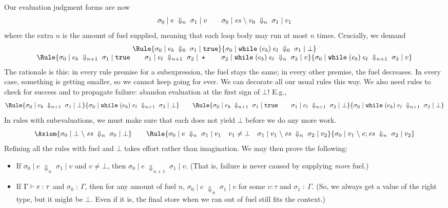 \documentclass{article}
\begin{document}
\newcommand{\JfEv}[5]{#1 \;|\; #2 \;\Downarrow_{#5}\; #3 \;|\; #4} 
\newcommand{\JfEvs}[6]{#1 \;|\; #2 \;\backslash\; #3 \;\Downarrow_{#6}\; #4 \;|\; #5}
Our evaluation judgment forms are now
\[\JfEv{\sigma_0}{e}{\sigma_1}{v}{n} \qquad
  \JfEvs{\sigma_0}{\es}{v_0}{\sigma_1}{v_1}{n}
\]
where the extra $n$ is the amount of fuel supplied, meaning that each
loop body may run at most $n$ times. Crucially, we demand
\[\begin{array}{c}
    \Rule{\JfEv{\sigma_0}{e_b}{\sigma_1}\true{0}}
    {\JfEv{\sigma_0}{\whi{e_b}{e_l}}{\sigma_1}{\bot}{0}}
    \\
    \Rule{\JfEv{\sigma_0}{e_b}{\sigma_1}\true{n+1} \qquad \JfEv{\sigma_1}{e_l}{\sigma_2}{\star}{n+1} \qquad
      \JfEv{\sigma_2}{\whi{e_b}{e_l}}{\sigma_3}{v}{n}  }
    {\JfEv{\sigma_0}{\whi{e_b}{e_l}}{\sigma_3}{v}{n+1}}
\end{array}\]
The rationale is this: in every rule premise for a subexpression,
the fuel stays the same; in every other premise, the fuel decreases.
In every case, something is getting smaller, so we cannot keep going
for ever. We can decorate all our usual rules this way.
We also need rules to check for success and to propagate failure:
abandon evaluation at the first sign of
$\bot$! E.g.,
\[
  \Rule{\JfEv{\sigma_0}{e_b}{\sigma_1}\bot{n+1} }
  {\JfEv{\sigma_0}{\whi{e_b}{e_l}}{\sigma_3}{\bot}{n+1}}
  \qquad
  \Rule{\JfEv{\sigma_0}{e_b}{\sigma_1}\true{n+1} \qquad \JfEv{\sigma_1}{e_l}{\sigma_2}{\bot}{n+1} }
    {\JfEv{\sigma_0}{\whi{e_b}{e_l}}{\sigma_3}{\bot}{n+1}}
  \]
In rules with subevaluations, we must make sure that each does not
  yield $\bot$ before we do any more work.
\[
  \Axiom{\JfEvs{\sigma_0}{\bot}{\es}{\sigma_0}{\bot}{n}} \qquad
 \Rule{\JfEv{\sigma_0}e{\sigma_1}{v_1}n \quad v_1\neq\bot\quad
    \JfEvs{\sigma_1}{v_1}{\es}{\sigma_2}{v_2}n}
   {\JfEvs{\sigma_0}{v_1}{e;\es}{\sigma_2}{v_2}n}
\]
Refining all the rules with fuel and $\bot$ takes effort rather than
imagination. We may then prove the following:
\begin{itemize}
\item If $\JfEv{\sigma_0}{e}{\sigma_1}{v}{n}$ and $v\neq \bot$, then
  $\JfEv{\sigma_0}{e}{\sigma_1}{v}{n+1}$. (That is, failure is never
  caused by supplying \emph{more} fuel.)
\item If $\Gamma \vdash e : \tau$ and $\sigma_0\;:\:\Gamma$, then for
  any amount of fuel $n$, $\JfEv{\sigma_0}{e}{\sigma_1}{v}{n}$ for
  some $v:\tau$ and $\sigma_1\;:\:\Gamma$. (So, we always get a
  value of the right type, but it might be $\bot$. Even if it is,
  the final store when we ran out of fuel still fits the context.)
\end{itemize}
\end{document}
